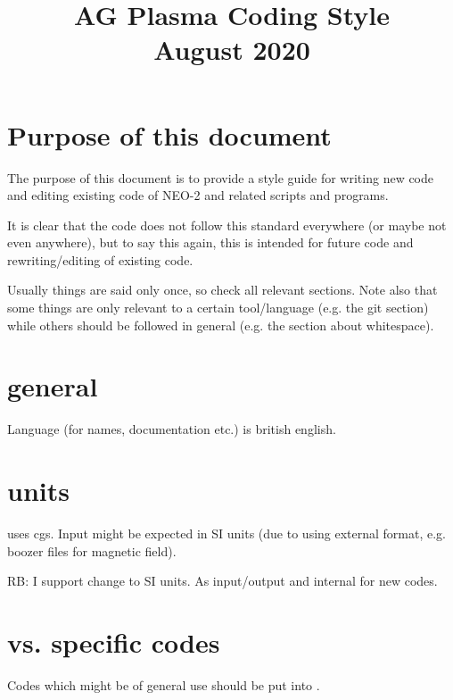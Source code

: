 \documentclass{article}
\title{\textbf{AG Plasma Coding Style\\August 2020}}
\begin{document}
\maketitle

\section{Purpose of this document}
The purpose of this document is to provide a style guide for writing new
code and editing existing code of NEO-2 and related scripts and
programs.

It is clear that the code does not follow this standard everywhere (or
maybe not even anywhere), but to say this again, this is intended for
future code and rewriting/editing of existing code.

Usually things are said only once, so check all relevant sections.
Note also that some things are only relevant to a certain tool/language
(e.g. the git section) while others should be followed in general (e.g.
the section about whitespace).

\section{general}
Language (for names, documentation etc.) is british english.

\section{units}
\neotwo uses cgs. Input might be expected in SI units (due
to using external format, e.g. boozer files for magnetic field).

RB: I support change to SI units. As input/output and internal for new
codes.

\section{\libneo vs. specific codes}
Codes which might be of general use should be put into \libneo.
\end{document}
